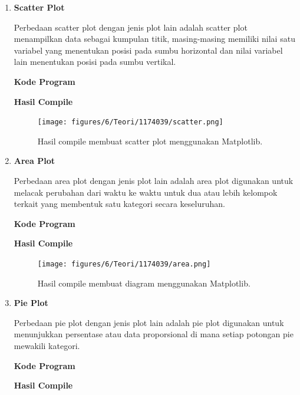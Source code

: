 \begin{enumerate}
	\item \textbf{Scatter Plot}
	
	Perbedaan scatter plot dengan jenis plot lain adalah scatter plot menampilkan data sebagai kumpulan titik, masing-masing memiliki nilai satu variabel yang menentukan posisi pada sumbu horizontal dan nilai variabel lain menentukan posisi pada sumbu vertikal.
	
	\textbf{Kode Program}
	
	
	
	\textbf{Hasil Compile}
	
	\begin{figure}[H]
		\texttt{[image: figures/6/Teori/1174039/scatter.png]}
		\centering
		\caption{Hasil compile membuat scatter plot menggunakan Matplotlib.}
	\end{figure}
	
	\item \textbf{Area Plot}
	
	Perbedaan area plot dengan jenis plot lain adalah area plot digunakan untuk melacak perubahan dari waktu ke waktu untuk dua atau lebih kelompok terkait yang membentuk satu kategori secara keseluruhan.
	
	\textbf{Kode Program}
	
	
	
	\textbf{Hasil Compile}
	
	\begin{figure}[H]
		\texttt{[image: figures/6/Teori/1174039/area.png]}
		\centering
		\caption{Hasil compile membuat diagram menggunakan Matplotlib.}
	\end{figure}
	
	\item \textbf{Pie Plot}
	
	Perbedaan pie plot dengan jenis plot lain adalah pie plot digunakan untuk menunjukkan persentase atau data proporsional di mana setiap potongan pie mewakili kategori.
	
	\textbf{Kode Program}
	
	
	
	\textbf{Hasil Compile}
	

\end{enumerate}
